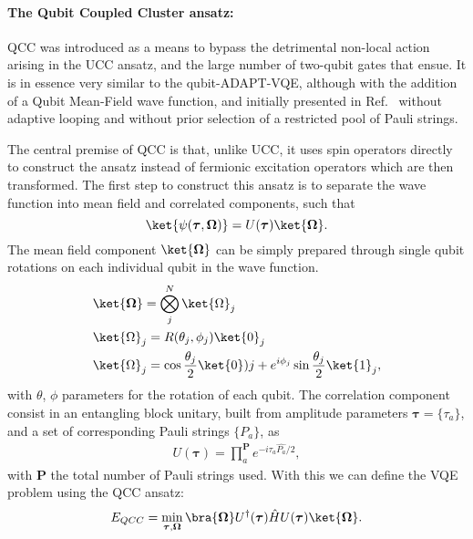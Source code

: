 \paragraph{The Qubit Coupled Cluster ansatz:} QCC was introduced as a means to bypass the detrimental non-local action arising in the UCC ansatz, and the large number of two-qubit gates that ensue. It is in essence very similar to the qubit-ADAPT-VQE, although with the addition of a Qubit Mean-Field wave function, and initially presented in Ref.~\cite{Ryabinkin2018} without adaptive looping and without prior selection of a restricted pool of Pauli strings.

The central premise of QCC is that, unlike UCC, it uses spin operators directly to construct the ansatz instead of fermionic excitation operators which are then transformed. The first step to construct this ansatz is to separate the wave function into mean field and correlated components, such that
\begin{equation}
    \ket{\psi(\boldsymbol{\tau}, \boldsymbol{\Omega})} = U(\boldsymbol{\tau}) \ket{\boldsymbol{\Omega}}.
\end{equation}
The mean field component $\ket{\boldsymbol{\Omega}}$ can be simply prepared through single qubit rotations on each individual qubit in the wave function.
\begin{align}
    &\ket{\boldsymbol{\Omega}} = \bigotimes_j^N \ket{\Omega}_j \nonumber \\
    & \ket{\Omega}_j = R(\theta_j, \phi_j) \ket{0}_j \nonumber \\
    &\ket{\Omega}_j =  \cos\frac{\theta_j}{2} \ket{0})j + e^{i\phi_j}\sin\frac{\theta_j}{2} \ket{1}_j,
\end{align}
with $\theta$, $\phi$ parameters for the rotation of each qubit. The correlation component consist in an entangling block unitary, built from amplitude parameters $\boldsymbol{\tau} = \{ \tau_a \}$, and a set of corresponding Pauli strings $\{ P_a\}$, as
\begin{align} \label{eq:qcc_generators}
    U(\boldsymbol{\tau}) = \prod_a^{\boldsymbol{P}}  e^{-i\tau_a \hat{P_a}/2},
\end{align}
with $\boldsymbol{P}$ the total number of Pauli strings used. With this we can define the VQE problem using the QCC ansatz:
\begin{align} \label{eq:cost_qcc}
    E_{QCC} = \min_{\boldsymbol{\tau}, \boldsymbol{\Omega}} \bra{\boldsymbol{\Omega}} U^{\dagger}(\boldsymbol{\tau}) \hat{H} U(\boldsymbol{\tau}) \ket{\boldsymbol{\Omega}}.
\end{align}

